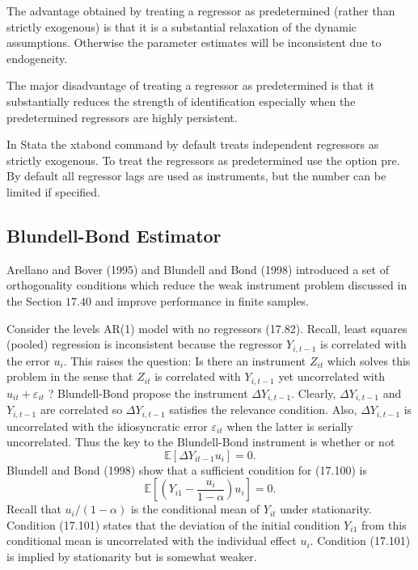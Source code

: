 \documentclass[10pt]{article}
\begin{document}
The advantage obtained by treating a regressor as predetermined (rather than strictly exogenous) is that it is a substantial relaxation of the dynamic assumptions. Otherwise the parameter estimates will be inconsistent due to endogeneity.

The major disadvantage of treating a regressor as predetermined is that it substantially reduces the strength of identification especially when the predetermined regressors are highly persistent.

In Stata the xtabond command by default treats independent regressors as strictly exogenous. To treat the regressors as predetermined use the option pre. By default all regressor lags are used as instruments, but the number can be limited if specified.

\subsection{Blundell-Bond Estimator}
Arellano and Bover (1995) and Blundell and Bond (1998) introduced a set of orthogonality conditions which reduce the weak instrument problem discussed in the Section $17.40$ and improve performance in finite samples.

Consider the levels AR(1) model with no regressors (17.82). Recall, least squares (pooled) regression is inconsistent because the regressor $Y_{i, t-1}$ is correlated with the error $u_{i}$. This raises the question: Is there an instrument $Z_{i t}$ which solves this problem in the sense that $Z_{i t}$ is correlated with $Y_{i, t-1}$ yet uncorrelated with $u_{i t}+\varepsilon_{i t}$ ? Blundell-Bond propose the instrument $\Delta Y_{i, t-1}$. Clearly, $\Delta Y_{i, t-1}$ and $Y_{i, t-1}$ are correlated so $\Delta Y_{i, t-1}$ satisfies the relevance condition. Also, $\Delta Y_{i, t-1}$ is uncorrelated with the idiosyncratic error $\varepsilon_{i t}$ when the latter is serially uncorrelated. Thus the key to the Blundell-Bond instrument is whether or not
$$
\mathbb{E}\left[\Delta Y_{i t-1} u_{i}\right]=0 .
$$
Blundell and Bond (1998) show that a sufficient condition for (17.100) is
$$
\mathbb{E}\left[\left(Y_{i 1}-\frac{u_{i}}{1-\alpha}\right) u_{i}\right]=0 .
$$
Recall that $u_{i} /(1-\alpha)$ is the conditional mean of $Y_{i t}$ under stationarity. Condition (17.101) states that the deviation of the initial condition $Y_{i 1}$ from this conditional mean is uncorrelated with the individual effect $u_{i}$. Condition (17.101) is implied by stationarity but is somewhat weaker.
\end{document}
